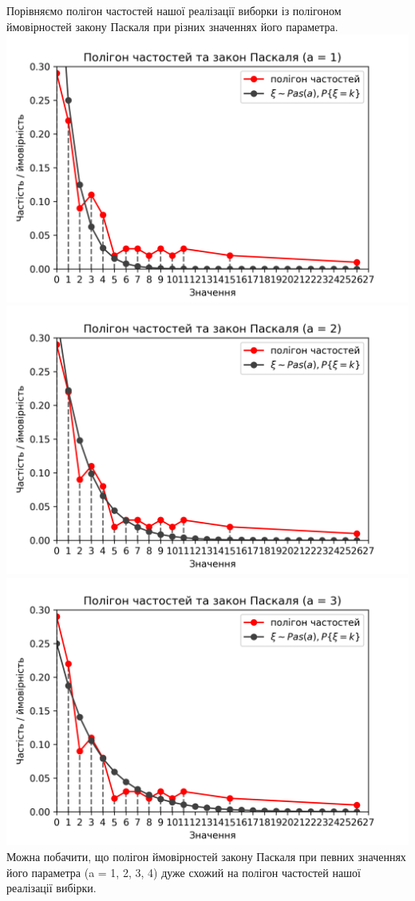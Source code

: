 \documentclass{article}
\begin{document}
Порівняємо полігон частостей нашої реалізації 
виборки із полігоном ймовірностей закону Паскаля при 
різних значеннях його параметра.
\newline
\includegraphics[scale = 0.8]{pol+pas1}
\newline
\includegraphics[scale = 0.8]{pol+pas2}
\newline
\includegraphics[scale = 0.8]{pol+pas3}
\newline
Можна побачити, що полігон ймовірностей закону Паскаля
при певних значеннях його параметра (a = 1, 2, 3, 4) 
дуже схожий на полігон частостей нашої реалізації вибірки.
\newpage
\end{document}
